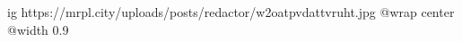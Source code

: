  
 
 
 
 

\ifcmt
  ig https://mrpl.city/uploads/posts/redactor/w2oatpvdattvruht.jpg
  @wrap center
  @width 0.9
\fi
